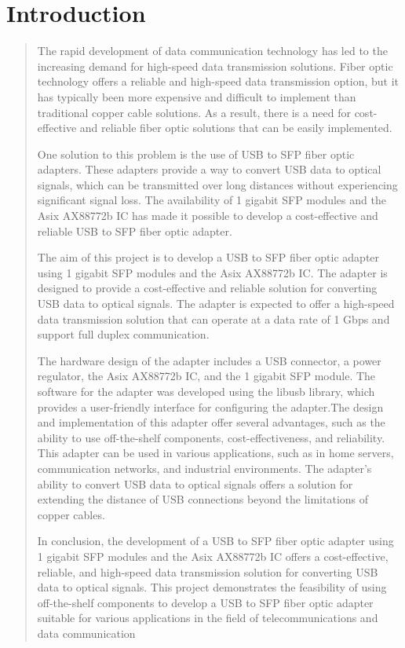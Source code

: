 \documentclass[fontsize=12pt,
parskip=half,	%
department=FakM,  %
twoside, %
DIV=15,BCOR=10mm, %
svgnames,table,hyperref, %
bookmarks, raiselinks, pageanchor, hyperindex, colorlinks, hidelinks, %
]{OTHRreprt}
\begin{document}
	
	\chapter{Introduction}
	\begin{quote}
	The rapid development of data communication technology has led to the increasing demand for high-speed data transmission solutions. Fiber optic technology offers a reliable and high-speed data transmission option, but it has typically been more expensive and difficult to implement than traditional copper cable solutions. As a result, there is a need for cost-effective and reliable fiber optic solutions that can be easily implemented.

One solution to this problem is the use of USB to SFP fiber optic adapters. These adapters provide a way to convert USB data to optical signals, which can be transmitted over long distances without experiencing significant signal loss. The availability of 1 gigabit SFP modules and the Asix AX88772b IC has made it possible to develop a cost-effective and reliable USB to SFP fiber optic adapter.

The aim of this project is to develop a USB to SFP fiber optic adapter using 1 gigabit SFP modules and the Asix AX88772b IC. The adapter is designed to provide a cost-effective and reliable solution for converting USB data to optical signals. The adapter is expected to offer a high-speed data transmission solution that can operate at a data rate of 1 Gbps and support full duplex communication.

The hardware design of the adapter includes a USB connector, a power regulator, the Asix AX88772b IC, and the 1 gigabit SFP module. The software for the adapter was developed using the libusb library, which provides a user-friendly interface for configuring the adapter.The design and implementation of this adapter offer several advantages, such as the ability to use off-the-shelf components, cost-effectiveness, and reliability. This adapter can be used in various applications, such as in home servers, communication networks, and industrial environments. The adapter's ability to convert USB data to optical signals offers a solution for extending the distance of USB connections beyond the limitations of copper cables.

In conclusion, the development of a USB to SFP fiber optic adapter using 1 gigabit SFP modules and the Asix AX88772b IC offers a cost-effective, reliable, and high-speed data transmission solution for converting USB data to optical signals. This project demonstrates the feasibility of using off-the-shelf components to develop a USB to SFP fiber optic adapter suitable for various applications in the field of telecommunications and data communication
	\end{quote}
	
\end{document}
